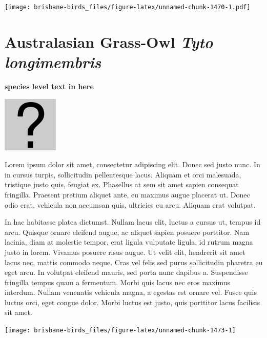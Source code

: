 \documentclass[]{book}
\let\origfigure\figure
\let\endorigfigure\endfigure
\renewenvironment{figure}[1][2] {
  \expandafter\origfigure\expandafter[H]
} {
  \endorigfigure
}
\begin{document}
\begin{figure}
\centering
\texttt{[image: brisbane-birds\_files/figure-latex/unnamed-chunk-1470-1.pdf]}
\caption{\label{fig:unnamed-chunk-1470}insert figure caption}
\end{figure}

\section{\texorpdfstring{Australasian Grass-Owl \emph{Tyto
longimembris}}{Australasian Grass-Owl Tyto longimembris}}\label{australasian-grass-owl-tyto-longimembris}

\textbf{species level text in here}

\begin{figure}
\centering
\includegraphics{assets/missing.png}
\caption{No image for species}
\end{figure}

Lorem ipsum dolor sit amet, consectetur adipiscing elit. Donec sed justo
nunc. In in cursus turpis, sollicitudin pellentesque lacus. Aliquam et
orci malesuada, tristique justo quis, feugiat ex. Phasellus at sem sit
amet sapien consequat fringilla. Praesent pretium aliquet ante, eu
maximus augue placerat ut. Donec odio erat, vehicula non accumsan quis,
ultricies eu arcu. Aliquam erat volutpat.

In hac habitasse platea dictumst. Nullam lacus elit, luctus a cursus ut,
tempus id arcu. Quisque ornare eleifend augue, ac aliquet sapien posuere
porttitor. Nam lacinia, diam at molestie tempor, erat ligula vulputate
ligula, id rutrum magna justo in lorem. Vivamus posuere risus augue. Ut
velit elit, hendrerit sit amet lacus nec, mattis commodo neque. Cras vel
felis sed purus sollicitudin pharetra eu eget arcu. In volutpat eleifend
mauris, sed porta nunc dapibus a. Suspendisse fringilla tempus quam a
fermentum. Morbi quis lacus nec eros maximus interdum. Nullam venenatis
vehicula magna, a egestas est ornare vel. Fusce quis luctus orci, eget
congue dolor. Morbi luctus est justo, quis porttitor lacus facilisis sit
amet.

\begin{figure}
\texttt{[image: brisbane-birds\_files/figure-latex/unnamed-chunk-1473-1]} \caption{insert figure caption}\label{fig:unnamed-chunk-1473}
\end{figure}
\end{document}
